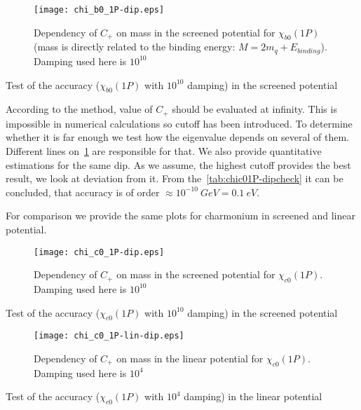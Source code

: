 \begin{figure}[H]
    \texttt{[image: chi\_b0\_1P-dip.eps]}
    \caption{Dependency of $C_+$ on mass in the screened potential for $\chi_{b0}(1P)$ (mass is directly related to the binding energy: $M = 2m_q + E_{binding}$). Damping used here is $10^{10}$} \label{fig:chib01P-dip}
\end{figure}

\begin{table}[H]
    
    \caption{Test of the accuracy ($\chi_{b0}(1P)$ with $10^{10}$ damping) in the screened potential} \label{tab:chib01P-dipcheck}
\end{table}

According to the method, value of $C_+$ should be evaluated at infinity. This is impossible in numerical calculations so cutoff has been introduced. To determine whether it is far enough we test how the eigenvalue depends on several of them. Different lines on~\cref{fig:chib01P-dip} are responsible for that. We also provide quantitative estimations for the same dip. As we assume, the highest cutoff provides the best result, we look at deviation from it. From the~\cref{tab:chic01P-dipcheck} it can be concluded, that accuracy is of order $\approx 10^{-10}~GeV = 0.1~eV$.

For comparison we provide the same plots for charmonium in screened and linear potential.

\begin{figure}[H]
    \texttt{[image: chi\_c0\_1P-dip.eps]}
    \caption{Dependency of $C_+$ on mass in the screened potential for $\chi_{c0}(1P)$. Damping used here is $10^{10}$} \label{fig:chic01P-dip}
\end{figure}

\begin{table}[H]
    
    \caption{Test of the accuracy ($\chi_{c0}(1P)$ with $10^{10}$ damping) in the screened potential} \label{tab:chic01P-dipcheck}
\end{table}

\begin{figure}[H]
    \texttt{[image: chi\_c0\_1P-lin-dip.eps]}
    \caption{Dependency of $C_+$ on mass in the linear potential for $\chi_{c0}(1P)$. Damping used here is $10^{4}$} \label{fig:chic01P-lin-dip}
\end{figure}

\begin{table}[H]
    
    \caption{Test of the accuracy ($\chi_{c0}(1P)$ with $10^{4}$ damping) in the linear potential} \label{tab:chic01P-lin-dipcheck}
\end{table}

